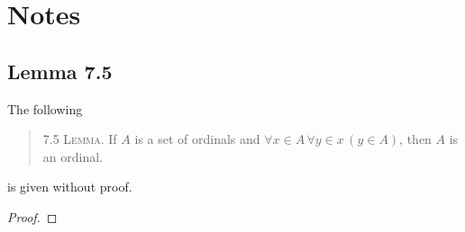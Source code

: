 
\section{Notes}

\subsection{Lemma 7.5}

The following 
\begin{quote}
  7.5 \textsc{Lemma.} If $A$ is a set of ordinals
  and \(\forall x\in A\, \forall y\in x\, (y\in A)\),
  then $A$ is an ordinal.
\end{quote}
is given without proof.
\begin{proof}

\end{proof}
